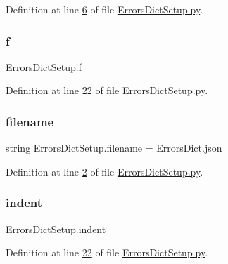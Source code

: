 Definition at line \mbox{\hyperlink{_errors_dict_setup_8py_source_l00006}{6}} of file \mbox{\hyperlink{_errors_dict_setup_8py_source}{Errors\+Dict\+Setup.\+py}}.

\mbox{\label{namespace_errors_dict_setup_aadfab4e19ca2acd086062511d8ec75a8}} 
\subsubsection{\texorpdfstring{f}{f}}
{\footnotesize\ttfamily Errors\+Dict\+Setup.\+f}



Definition at line \mbox{\hyperlink{_errors_dict_setup_8py_source_l00022}{22}} of file \mbox{\hyperlink{_errors_dict_setup_8py_source}{Errors\+Dict\+Setup.\+py}}.

\mbox{\label{namespace_errors_dict_setup_a0c97c48fca0fdec3e730b9df1dbab9c7}} 
\subsubsection{\texorpdfstring{filename}{filename}}
{\footnotesize\ttfamily string Errors\+Dict\+Setup.\+filename = \textquotesingle{}Errors\+Dict.\+json\textquotesingle{}}



Definition at line \mbox{\hyperlink{_errors_dict_setup_8py_source_l00002}{2}} of file \mbox{\hyperlink{_errors_dict_setup_8py_source}{Errors\+Dict\+Setup.\+py}}.

\mbox{\label{namespace_errors_dict_setup_a3c8f88b66a58f9c28e5d3bd66fa6191a}} 
\subsubsection{\texorpdfstring{indent}{indent}}
{\footnotesize\ttfamily Errors\+Dict\+Setup.\+indent}



Definition at line \mbox{\hyperlink{_errors_dict_setup_8py_source_l00022}{22}} of file \mbox{\hyperlink{_errors_dict_setup_8py_source}{Errors\+Dict\+Setup.\+py}}.

